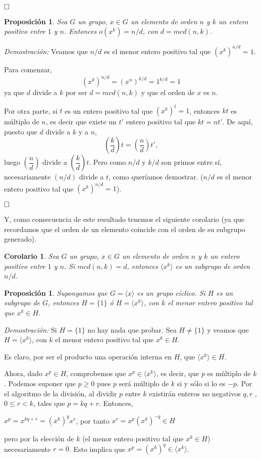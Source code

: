 \documentclass[12pt]{article}
\newtheorem{proposition}[theorem]{Proposición}
\newtheorem{corolario}{Corolario}[theorem]
\begin{document}
$\hfill \square$

\begin{proposition}\label{eq:oxk}
Sea $G$ un grupo, $x \in G$ un elemento de orden $n$ y $k$ un entero positivo entre $1$ y $n$. Entonces $o(x^{k}) = n/d$, con $d= mcd(n,k)$.
\end{proposition}
\emph{Demostración: } Veamos que $n/d$ es el menor entero positivo tal que $(x^{k})^{n/d} = 1$.

Para comenzar, $$(x^{k})^{n/d} = (x^{n})^{k/d} = 1^{k/d} = 1$$ ya que $d$ divide a $k$ por ser $d = mcd(n,k)$ y que el orden de $x$ es $n$.

Por otra parte, si $t$ es un entero positivo tal que $(x^{k})^{t} = 1$, entonces $kt$ es múltiplo de $n$, es decir que existe un $t'$ entero positivo tal que $kt = nt'$. De aquí, puesto que $d$ divide a $k$  y a $n$, $$\left( \dfrac{k}{d}\right)t =\left( \dfrac{n}{d}\right) t',$$ luego $\left( \dfrac{n}{d}\right) $ divide a $\left( \dfrac{k}{d}\right) t$. Pero como $n/d$ y $k/d$ son primos entre sí, necesariamente $(n/d)$ divide a $t$, como queríamos demostrar. ($n/d$ es el menor entero positivo tal que $(x^{k})^{n/d} = 1$).

$\hfill \square$

Y, como consecuencia de este resultado tenemos el siguiente corolario (ya que recordamos que el orden de un elemento coincide con el orden de su subgrupo generado).

\begin{corolario}
Sea $G$ un grupo, $x \in G$ un elemento de orden $n$ y $k$ un entero positivo entre $1$ y $n$. Si $mcd(n,k)= d$, entonces $\langle x ^{k} \rangle$ es un subgrupo de orden $n/d$.
\end{corolario}
\begin{proposition}Supongamos que $G = \langle x \rangle$ es un grupo cíclico. Si $H$ es un subgrupo de $G$, entonces $H = \lbrace 1 \rbrace$ ó $H = \langle x^{k} \rangle$, con $k$ el menor entero positivo tal que $x^{k} \in H$.
\end{proposition}
\emph{Demostración: } Si $H = \lbrace 1 \rbrace$ no hay nada que probar. Sea $H \neq \lbrace 1 \rbrace$ y veamos que $H = \langle x^{k} \rangle$, con $k$ el menor entero positivo tal que $x^{k} \in H$.

Es claro, por ser el producto una operación interna en $H$, que $\langle x^{k} \rangle \in H$.

Ahora, dado $x ^{p} \in H$, comprobemos que $x^{p} \in \langle x^{k} \rangle$, es decir, que $p$ es múltiplo de $k$. Podemos suponer que $p \geq 0$ pues $p$ será múltiplo de $k$ si y sólo si lo es $-p$. Por el algoritmo de la división, al dividir $p$ entre $k$ existirán enteros no negativos $q,r$ , $0 \leq r < k$, tales que $p = kq + r$. Entonces, 
\begin{center}
$x^{p} = x^{kq+r} = (x^{k})^{q}x^{r}$, por tanto $x^{r} = x^{p}(x^{k})^{-q} \in H$
\end{center}
pero por la elección de $k$ (el menor entero positivo tal que $x^{k} \in H$) necesariamente $r = 0$. Esto implica que $x^{p} = (x^{k})^{q} \in \langle x^{k} \rangle$.
\end{document}

